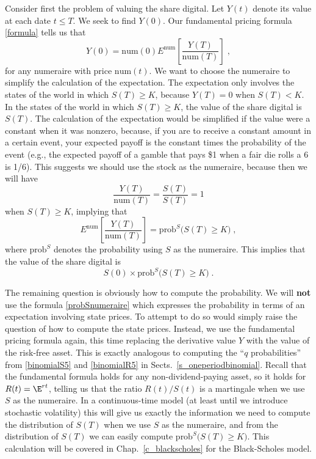 Consider first the problem of valuing the share digital.  Let $Y(t)$ denote its value at each date $t \leq T$.   We seek to find $Y(0)$.  Our fundamental pricing formula \eqref{formula} tells us that
$$Y(0) = \text{num}(0) E^\text{num} \left[\frac{Y(T)}{\text{num}(T)}\right]\; ,$$
for any numeraire with price $\text{num}(t)$.  We want to choose the numeraire to simplify the calculation of the expectation.  The expectation only involves the states of the world in which $S(T) \geq K$, because $Y(T)=0$ when $S(T)<K$.  In the states of the world in which $S(T) \geq K$, the value of the share digital is $S(T)$.  The calculation of the expectation would be simplified if the value were a constant when it was nonzero, because, if you are to receive a constant amount in a certain event, your expected payoff is the constant times the probability of the event (e.g., the expected payoff of a gamble that pays \$1 when a fair die rolls a 6 is 1/6).  This suggests we should use the stock as the numeraire, because then we will have
$$\frac{Y(T)}{\text{num}(T)} = \frac{S(T)}{S(T)} = 1$$
when $S(T) \geq K$, implying that
$$E^\text{num} \left[\frac{Y(T)}{\text{num}(T)}\right] = \text{prob}^S\big(S(T)\geq K\big)\; ,$$
where $\text{prob}^S$ denotes the probability using $S$ as the numeraire.  This implies that the value of the share digital is
$$S(0) \times \text{prob}^S\big(S(T)\geq K\big)\;.$$

The remaining question is obviously how to compute the probability.  We will \textbf{not} use the formula \eqref{probSnumeraire} which expresses the probability in terms of an expectation involving state prices.  To attempt to do so would simply raise the question of how to compute the state prices.  Instead, we use the fundamental pricing formula again, this time replacing the derivative value $Y$ with the value of the risk-free asset.  This is exactly analogous to computing the ``$q$ probabilities'' from  \eqref{binomialS5} and \eqref{binomialR5} in Sects.~\ref{s_oneperiodbinomial}.  Recall that the fundamental formula holds for any non-dividend-paying asset, so it holds for $R(t)=\E^{rt}$, telling us that the ratio $R(t)/S(t)$ is a martingale when we use $S$ as the numeraire.  In a continuous-time model (at least until we introduce stochastic volatility) this will give us exactly the information we need to compute the distribution of $S(T)$ when we use $S$ as the numeraire, and from the distribution of $S(T)$ we can easily compute $\text{prob}^S\big(S(T)\geq K\big)$.  This calculation will be covered in Chap.~\ref{c_blackscholes} for the Black-Scholes model.

